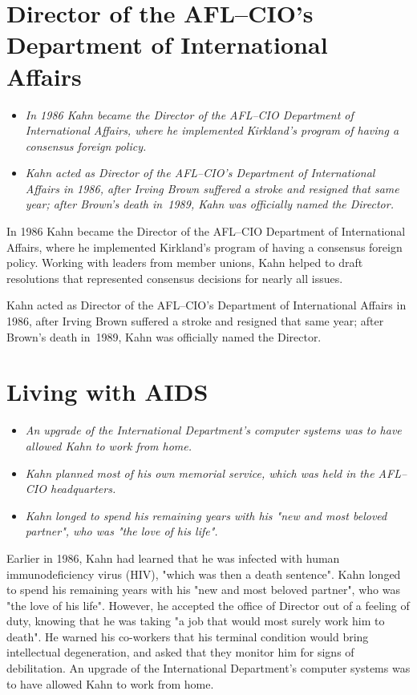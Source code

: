 \section{Director of the AFL--CIO's Department of International
Affairs}\label{director-of-the-aflcios-department-of-international-affairs}

\begin{itemize}
\item
  \emph{In 1986 Kahn became the Director of the AFL--CIO Department of
  International Affairs, where he implemented Kirkland's program of
  having a consensus foreign policy.}
\item
  \emph{Kahn acted as Director of the AFL--CIO's Department of
  International Affairs in 1986, after Irving Brown suffered a stroke
  and resigned that same year; after Brown's death in~1989, Kahn was
  officially named the Director.}
\end{itemize}

In 1986 Kahn became the Director of the AFL--CIO Department of
International Affairs, where he implemented Kirkland's program of having
a consensus foreign policy. Working with leaders from member unions,
Kahn helped to draft resolutions that represented consensus decisions
for nearly all issues.

Kahn acted as Director of the AFL--CIO's Department of International
Affairs in 1986, after Irving Brown suffered a stroke and resigned that
same year; after Brown's death in~1989, Kahn was officially named the
Director.

\section{Living with AIDS}\label{living-with-aids}

\begin{itemize}
\item
  \emph{An upgrade of the International Department's computer systems
  was to have allowed Kahn to work from home.}
\item
  \emph{Kahn planned most of his own memorial service, which was held in
  the AFL--CIO headquarters.}
\item
  \emph{Kahn longed to spend his remaining years with his "new and most
  beloved partner", who was "the love of his life".}
\end{itemize}

Earlier in 1986, Kahn had learned that he was infected with human
immunodeficiency virus (HIV), "which was then a death sentence". Kahn
longed to spend his remaining years with his "new and most beloved
partner", who was "the love of his life". However, he accepted the
office of Director out of a feeling of duty, knowing that he was taking
"a job that would most surely work him to death". He warned his
co-workers that his terminal condition would bring intellectual
degeneration, and asked that they monitor him for signs of debilitation.
An upgrade of the International Department's computer systems was to
have allowed Kahn to work from home.

